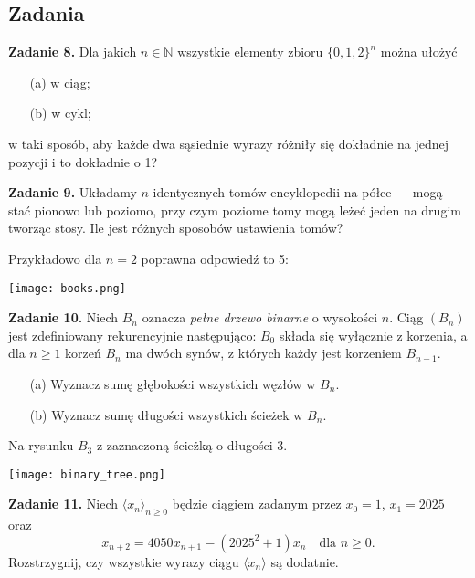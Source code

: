 \documentclass[../index.tex]{subfiles}
\begin{document}
    \subsection{Zadania}

    \textbf{Zadanie 8.} Dla jakich $n \in \mathbb{N}$ wszystkie elementy zbioru $\{0,1,2\}^n$ można ułożyć
    \begin{itemize}
        \item[(a)] w ciąg;
        \item[(b)] w cykl;
    \end{itemize}
    w taki sposób, aby każde dwa sąsiednie wyrazy różniły się dokładnie na jednej pozycji i to dokładnie o 1?

    \textbf{Zadanie 9.} Układamy $n$ identycznych tomów encyklopedii na półce — mogą stać pionowo lub poziomo, przy czym poziome tomy mogą leżeć jeden na drugim tworząc stosy. Ile jest różnych sposobów ustawienia tomów?

    Przykładowo dla $n=2$ poprawna odpowiedź to 5:
    \begin{center}
        \texttt{[image: books.png]}
    \end{center}

    \textbf{Zadanie 10.} Niech $B_n$ oznacza \textit{pełne drzewo binarne} o wysokości $n$. Ciąg $(B_n)$ jest zdefiniowany rekurencyjnie następująco: $B_0$ składa się wyłącznie z korzenia, a dla $n \geq 1$ korzeń $B_n$ ma dwóch synów, z których każdy jest korzeniem $B_{n-1}$.

    \begin{itemize}
        \item[(a)] Wyznacz sumę głębokości wszystkich węzłów w $B_n$.
        \item[(b)] Wyznacz sumę długości wszystkich ścieżek w $B_n$.
    \end{itemize}

    Na rysunku $B_3$ z zaznaczoną ścieżką o długości 3.

    \begin{center}
        \texttt{[image: binary\_tree.png]}
    \end{center}

    \textbf{Zadanie 11.} Niech $\langle x_n \rangle_{n \geq 0}$ będzie ciągiem zadanym przez $x_0 = 1$, $x_1 = 2025$ oraz
    \[
    x_{n+2} = 4050 x_{n+1} - (2025^2 + 1) x_n \quad \text{dla } n \geq 0.
    \]
    Rozstrzygnij, czy wszystkie wyrazy ciągu $\langle x_n \rangle$ są dodatnie.
\end{document}
